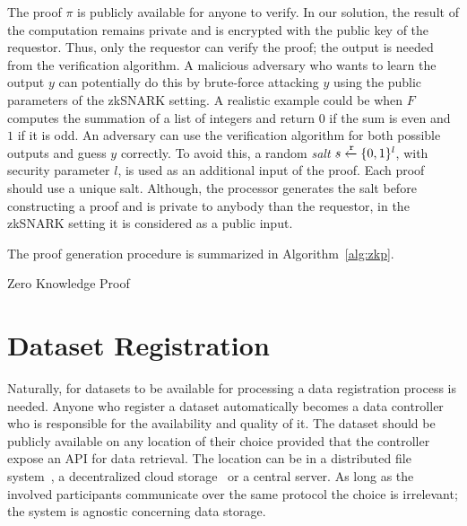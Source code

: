 The proof $\pi$ is publicly available for anyone to verify. In our solution, the result of the computation remains private and is encrypted with the public key of the requestor. Thus, only the requestor can verify the proof; the output is needed from the verification algorithm. A malicious adversary who wants to learn the output $y$ can potentially do this by brute-force attacking $y$ using the public parameters of the zkSNARK setting. A realistic example could be when $F$ computes the summation of a list of integers and return $0$ if the sum is even and $1$ if it is odd. An adversary can use the verification algorithm for both possible outputs and guess $y$ correctly. To avoid this, a random \textit{salt} $s \xleftarrow{\mathtt{r}}{\{0, 1\}^{l}}$, with security parameter $l$, is used as an additional input of the proof. Each proof should use a unique salt. Although, the processor generates the salt before constructing a proof and is private to anybody than the requestor, in the zkSNARK setting it is considered as a public input.

The proof generation procedure is summarized in Algorithm~\ref{alg:zkp}.

\begin{algorithm}[!htb]
  \caption{Zero Knowledge Proof}\label{alg:zkp}
  \begin{algorithmic}[1]
     
     
    \State {} 
  \EndFunction
     
     
  \EndProcedure
  \end{algorithmic}
\end{algorithm}

\section{Dataset Registration}
\label{solution:flow:reg_data}

Naturally, for datasets to be available for processing a data registration process is needed. Anyone who register a dataset automatically becomes a data controller who is responsible for the availability and quality of it. The dataset should be publicly available on any location of their choice provided that the controller expose an API for data retrieval. The location can be in a distributed file system~\cite{ipfs}, a decentralized cloud storage~\cite{storj} or a central server. As long as the involved participants communicate over the same protocol the choice is irrelevant; the system is agnostic concerning data storage.

